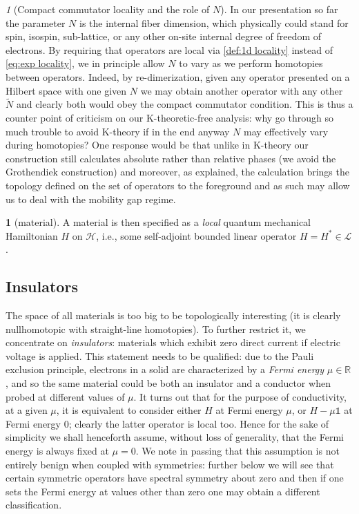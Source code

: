 \documentclass[a4paper,10pt]{article}
\numberwithin{equation}{section}
\theoremstyle{plain}
\theoremstyle{plain}
\theoremstyle{plain}
\theoremstyle{plain}
\theoremstyle{plain}
\theoremstyle{remark}
\newtheorem{rem}[thm]{\protect\remarkname}
\theoremstyle{definition}
\newtheorem{defn}[thm]{\protect\definitionname}
\theoremstyle{plain}
\providecommand{\definitionname}{Definition}
\providecommand{\remarkname}{Remark}
\newcommand{\RR}{\mathbb{R}}
\newcommand{\calH}{\mathcal{H}}
\newcommand{\calL}{\mathcal{L}}
\newcommand{\Id}{\mathds{1}}
\begin{document}
	\begin{rem}[Compact commutator locality and the role of $N$]\label{rem:the role of N with the compact commutator condition} In our presentation so far the parameter $N$ is the internal fiber dimension, which physically could stand for spin, isospin, sub-lattice, or any other on-site internal degree of freedom of electrons. By requiring that operators are local via \cref{def:1d locality} instead of \cref{eq:exp locality}, we in principle allow $N$ to vary as we perform homotopies between operators. Indeed, by re-dimerization, given any operator presented on a Hilbert space with one given $N$ we may obtain another operator with any other $\widetilde{N}$ and clearly both would obey the compact commutator condition. This is thus a counter point of criticism on our K-theoretic-free analysis: why go through so much trouble to avoid K-theory if in the end anyway $N$ may effectively vary during homotopies? One response would be that unlike in K-theory our construction still calculates absolute rather than relative phases (we avoid the Grothendiek construction) and moreover, as explained, the calculation brings the topology defined on the set of operators to the foreground and as such may allow us to deal with the mobility gap regime.
	\end{rem}
	
	\begin{defn}[material]
		A material is then specified as a \emph{local} quantum mechanical Hamiltonian $H$ on $\calH$, i.e., some self-adjoint bounded linear operator $H=H^\ast\in\calL$.
	\end{defn}
	
	\subsection{Insulators}
	The space of all materials is too big to be topologically interesting (it is clearly nullhomotopic with straight-line homotopies). To further restrict it, we concentrate on \emph{insulators}: materials which exhibit zero direct current if electric voltage is applied. This statement needs to be qualified: due to the Pauli exclusion principle, electrons in a solid are characterized by a \emph{Fermi energy} $\mu\in\RR$, and so the same material could be both an insulator and a conductor when probed at different values of $\mu$. It turns out that for the purpose of conductivity, at a given $\mu$, it is equivalent to consider either $H$ at Fermi energy $\mu$, or $H-\mu\Id$ at Fermi energy $0$; clearly the latter operator is local too. Hence for the sake of simplicity we shall henceforth assume, without loss of generality, that the Fermi energy is always fixed at $\mu=0$. We note in passing that this assumption is not entirely benign when coupled with symmetries: further below we will see that certain symmetric operators have spectral symmetry about zero and then if one sets the Fermi energy at values other than zero one may obtain a different classification. 
	
\end{document}
